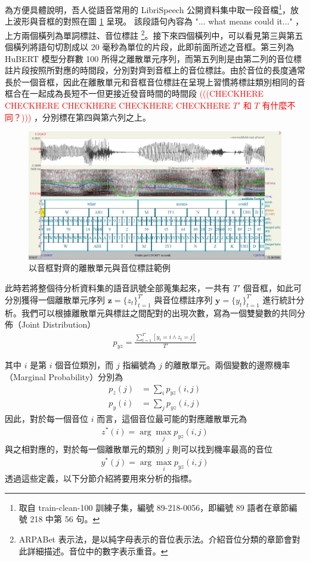         為方便具體說明，吾人從語音常用的 LibriSpeech \cite{panayotov_librispeech_2015} 公開資料集中取一段音檔\footnote{取自 train-clean-100 訓練子集，編號 89-218-0056，即編號 89 語者在章節編號 218 中第 56 句。}，放上波形與音框的對照在圖 \ref{fig:enter-labelwav} 呈現。 該段語句內容為 "... what means could it..." ，上方兩個橫列為單詞標註、音位標註 \footnote{ARPABet 表示法，是以純字母表示的音位表示法。介紹音位分類的章節會對此詳細描述。音位中的數字表示重音。}。接下來四個橫列中，可以看見第三與第五個橫列將語句切割成以 20 毫秒為單位的片段，此即前面所述之音框。第三列為 HuBERT 模型分群數 100 所得之離散單元序列，而第五列則是由第二列的音位標註片段按照所對應的時間段，分別對齊到音框上的音位標註。由於音位的長度通常長於一個音框，因此在離散單元和音框音位標註在呈現上習慣將標註類別相同的音框合在一起成為長短不一但更接近發音時間的時間段\textcolor{red}{   (((CHECKHERE CHECKHERE CHECKHERE CHECKHERE CHECKHERE $T'$ 和 $T$ 有什麼不同？)))  }，分別標在第四與第六列之上。
        \begin{figure}
            \centering
            \includegraphics[width=1\linewidth]{figures/praat.png}
            \caption{以音框對齊的離散單元與音位標註範例}
            \label{fig:enter-labelwav}
        \end{figure}
        
        此時若將整個待分析資料集的語音訊號全部蒐集起來，一共有 $T'$ 個音框，如此可分別獲得一個離散單元序列 $\boldsymbol{z} = \{z_t\}_{t=1}^{T'}$ 與音位標註序列 $\boldsymbol{y} = \{y_t\}_{t=1}^{T'}$ 進行統計分析。我們可以根據離散單元與標註之間配對的出現次數，寫為一個雙變數的共同分佈（Joint Distribution）
\begin{align}
    p_{yz} = \frac{\sum^{T'}_{t=1}[{y_t = i \wedge z_t = j}]}{T'}
\end{align}

其中 $i$ 是第 $i$ 個音位類別，而 $j$ 指編號為 $j$ 的離散單元。兩個變數的邊際機率（Marginal Probability）分別為
\begin{align}
    p_z(j) & =\sum_i{p_{yz}(i, j)} \\
    p_y(i) & =\sum_j{p_{yz}(i, j)}
\end{align}
因此，對於每一個音位 $i$ 而言，這個音位最可能的對應離散單元為
\begin{align}
    z^\ast(i) = \arg\max_j p_{yz}(i, j)
\end{align}
與之相對應的，對於每一個離散單元的類別 $j$ 則可以找到機率最高的音位
\begin{align}
    y^\ast(j) = \arg\max_i p_{yz}(i,j)
\end{align}
透過這些定義，以下分節介紹將要用來分析的指標。

